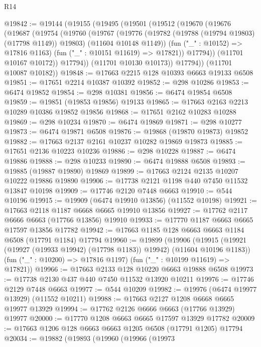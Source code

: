 \begin{lexlean}{R14}
\begin{coremodule}
@19842 := @19144
    (@19155
      (@19495
        (@19501
          (@19512
            (@19670
              (@19676
                (@19687
                  (@19754
                    (@19760
                      (@19767
                        (@19776
                          (@19782 (@19788 (@19794 @19803) (@17798 @1149)) @19803)
                          (@11604 @10148 @1149))
                        (fun ("_" : @10152) => @17816 @1163)
                        (fun ("_" : @10151 @11619) => @17821))
                      @17794))
                  (@11701 @10167 @10172))
                @17794))
            (@11701 @10130 @10173))
          @17794))
      (@11701 @10087 @10182))
@19848 := @17663 @2215 @128 @10393 @6663 @19133 @6508
@19851 := @17651 @2214 @10387 @10392
@19852 := @298 @10286
@19853 := @6474 @19852
@19854 := @298 @10381
@19856 := @6474 @19854 @6508
@19859 := @19851 (@19853 @19856) @19133
@19865 := @17663 @2163 @2213 @10289 @10386 @19852 @19856
@19868 := @17651 @2162 @10283 @10288
@19869 := @298 @10234
@19870 := @6474 @19869
@19871 := @298 @10277
@19873 := @6474 @19871 @6508
@19876 := @19868 (@19870 @19873) @19852
@19882 := @17663 @2137 @2161 @10237 @10282 @19869 @19873
@19885 := @17651 @2136 @10223 @10236
@19886 := @298 @10228
@19887 := @6474 @19886
@19888 := @298 @10233
@19890 := @6474 @19888 @6508
@19893 := @19885 (@19887 @19890) @19869
@19899 := @17663 @2124 @2135 @10207 @10222 @19886 @19890
@19906 := @17738 @2121 @1198 @440 @7450 @11532 @13847 @10198
@19909 := @17746 @2120 @7448 @6663
@19910 := @544 @10196
@19915 := @19909 (@6474 @19910 @13856) (@11552 @10198)
@19921 := @17663 @2118 @1187 @6668 @6665 @19910 @13856
@19927 := @17762 @2117 @6666 @6663 (@17766 @13856) @19910
@19933 := @17770 @1187 @6663 @6665 @17597 @13856 @17782
@19942 := @17663 @1185 @128 @6663 @6663 @1184 @6508 (@17791 @1184) @17794
@19960 := @19899
    (@19906
      (@19915 (@19921 (@19927 (@19933 @19942) (@17798 @1183)) @19942) (@11604 @10196 @1183))
      (fun ("_" : @10200) => @17816 @1197)
      (fun ("_" : @10199 @11619) => @17821))
@19966 := @17663 @2133 @128 @10220 @6663 @19888 @6508
@19973 := @17738 @2130 @437 @440 @7450 @11532 @13920 @10211
@19976 := @17746 @2129 @7448 @6663
@19977 := @544 @10209
@19982 := @19976 (@6474 @19977 @13929) (@11552 @10211)
@19988 := @17663 @2127 @1208 @6668 @6665 @19977 @13929
@19994 := @17762 @2126 @6666 @6663 (@17766 @13929) @19977
@20000 := @17770 @1208 @6663 @6665 @17597 @13929 @17782
@20009 := @17663 @1206 @128 @6663 @6663 @1205 @6508 (@17791 @1205) @17794
@20034 := @19882
    (@19893
      (@19960
        (@19966
          (@19973

\end{coremodule}
\end{lexlean}
